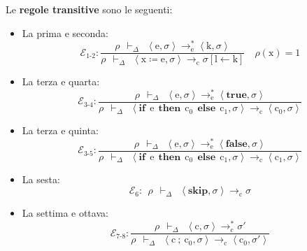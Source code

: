 \documentclass[a4paper]{article}
\begin{document}
 	Le \textcolor{Red3}{\textbf{regole transitive}} sono le seguenti:
 	\begin{itemize}
 		\item La prima e seconda:
 		\begin{equation*}
 			\mathcal{E}_{1\text{-}2} : \dfrac{
 				\rho \:\: \vdash_{\Delta} \:\: \left\langle \mathrm{e}, \sigma \right\rangle \longrightarrow^{*}_{\mathrm{e}} \left\langle \mathrm{k}, \sigma \right\rangle  
			}{
				\rho \:\: \vdash_{\Delta} \:\: \left\langle \mathrm{x} \coloneq \mathrm{e}, \sigma \right\rangle \longrightarrow_{\mathrm{c}} \sigma\left[\mathrm{l} \leftarrow \mathrm{k}\right]
			} \hspace{1em} \rho\left(\mathrm{x}\right) = 1
 		\end{equation*}
 		
 		\item La terza e quarta:
 		\begin{equation*}
 			\mathcal{E}_{3\text{-}4} : \dfrac{
 				\rho \:\: \vdash_{\Delta} \:\: \left\langle \mathrm{e}, \sigma \right\rangle \longrightarrow^{*}_{\mathrm{e}} \left\langle \mathbf{true}, \sigma \right\rangle
			}
 			{
 				\rho \:\: \vdash_{\Delta} \:\: \left\langle \mathbf{if} \:\: \mathrm{e} \:\: \mathbf{then} \:\: \mathrm{c}_{0} \:\: \mathbf{else} \:\: \mathrm{c}_{1}, \sigma \right\rangle \longrightarrow_{\mathrm{c}} \left\langle \mathrm{c}_{0}, \sigma \right\rangle
			}
 		\end{equation*}
 		
 		\item La terza e quinta:
 		\begin{equation*}
 			\mathcal{E}_{3\text{-}5} : \dfrac{
 				\rho \:\: \vdash_{\Delta} \:\: \left\langle \mathrm{e}, \sigma \right\rangle \longrightarrow^{*}_{\mathrm{e}} \left\langle \mathbf{false}, \sigma \right\rangle
 			}
 			{
 				\rho \:\: \vdash_{\Delta} \:\: \left\langle \mathbf{if} \:\: \mathrm{e} \:\: \mathbf{then} \:\: \mathrm{c}_{0} \:\: \mathbf{else} \:\: \mathrm{c}_{1}, \sigma \right\rangle \longrightarrow_{\mathrm{c}} \left\langle \mathrm{c}_{1}, \sigma \right\rangle
 			}
 		\end{equation*}
 		
 		\item La sesta:
 		\begin{equation*}
 			\mathcal{E}_{6}: \:\: \rho \:\: \vdash_{\Delta} \:\: \left\langle \mathbf{skip}, \sigma \right\rangle \rightarrow_{\mathrm{c}} \sigma
 		\end{equation*}
 		
 		\item La settima e ottava:
 		\begin{equation*}
 			\mathcal{E}_{7\text{-}8} : \dfrac{
 				\rho \:\: \vdash_{\Delta} \:\: \left\langle \mathrm{c}, \sigma \right\rangle \rightarrow_{\mathrm{c}}^{*} \sigma'
 			}{
 				\rho \:\: \vdash_{\Delta} \:\: \left\langle \mathrm{c} \: \boldsymbol{;} \: \mathrm{c}_{0}, \sigma \right\rangle \rightarrow_{\mathrm{c}} \left\langle \mathrm{c}_{0}, \sigma' \right\rangle
 			}
 		\end{equation*}
 	\end{itemize}\newpage
 	
\end{document}
